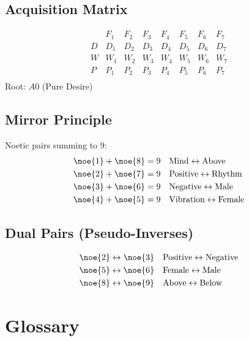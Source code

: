 \section{Acquisition Matrix}

\[
\begin{array}{c|ccccccc}
 & F_1 & F_2 & F_3 & F_4 & F_5 & F_6 & F_7 \\
\hline
D & D_1 & D_2 & D_3 & D_4 & D_5 & D_6 & D_7 \\
W & W_1 & W_2 & W_3 & W_4 & W_5 & W_6 & W_7 \\
P & P_1 & P_2 & P_3 & P_4 & P_5 & P_6 & P_7 \\
\end{array}
\]
Root: $A0$ (Pure Desire)

\section{Mirror Principle}

Noetic pairs summing to 9:
\begin{align*}
\noe{1} + \noe{8} &= 9 && \text{Mind} \leftrightarrow \text{Above} \\
\noe{2} + \noe{7} &= 9 && \text{Positive} \leftrightarrow \text{Rhythm} \\
\noe{3} + \noe{6} &= 9 && \text{Negative} \leftrightarrow \text{Male} \\
\noe{4} + \noe{5} &= 9 && \text{Vibration} \leftrightarrow \text{Female}
\end{align*}

\section{Dual Pairs (Pseudo-Inverses)}

\begin{align*}
\noe{2} &\leftrightarrow \noe{3} && \text{Positive} \leftrightarrow \text{Negative} \\
\noe{5} &\leftrightarrow \noe{6} && \text{Female} \leftrightarrow \text{Male} \\
\noe{8} &\leftrightarrow \noe{9} && \text{Above} \leftrightarrow \text{Below}
\end{align*}

\chapter{Glossary}
\label{app:glossary}


